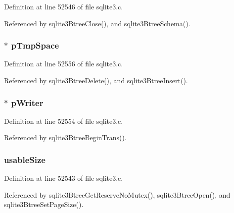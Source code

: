 Definition at line 52546 of file sqlite3.\+c.



Referenced by sqlite3\+Btree\+Close(), and sqlite3\+Btree\+Schema().

\hypertarget{struct_bt_shared_a89d36b1f2b625622fa2b7e49c578bdf2}{}
\subsubsection[{p\+Tmp\+Space}]{$\ast$ p\+Tmp\+Space}\label{struct_bt_shared_a89d36b1f2b625622fa2b7e49c578bdf2}


Definition at line 52556 of file sqlite3.\+c.



Referenced by sqlite3\+Btree\+Delete(), and sqlite3\+Btree\+Insert().

\hypertarget{struct_bt_shared_a0bc58cbb58aebf87675023a1af689a2b}{}
\subsubsection[{p\+Writer}]{$\ast$ p\+Writer}\label{struct_bt_shared_a0bc58cbb58aebf87675023a1af689a2b}


Definition at line 52554 of file sqlite3.\+c.



Referenced by sqlite3\+Btree\+Begin\+Trans().

\hypertarget{struct_bt_shared_a70b6ce95d7e84acc2a6977de8467cc9d}{}
\subsubsection[{usable\+Size}]{ usable\+Size}\label{struct_bt_shared_a70b6ce95d7e84acc2a6977de8467cc9d}


Definition at line 52543 of file sqlite3.\+c.



Referenced by sqlite3\+Btree\+Get\+Reserve\+No\+Mutex(), sqlite3\+Btree\+Open(), and sqlite3\+Btree\+Set\+Page\+Size().

\hypertarget{struct_bt_shared_abd937f71f6aed2873899ffb6ed52e459}{}
